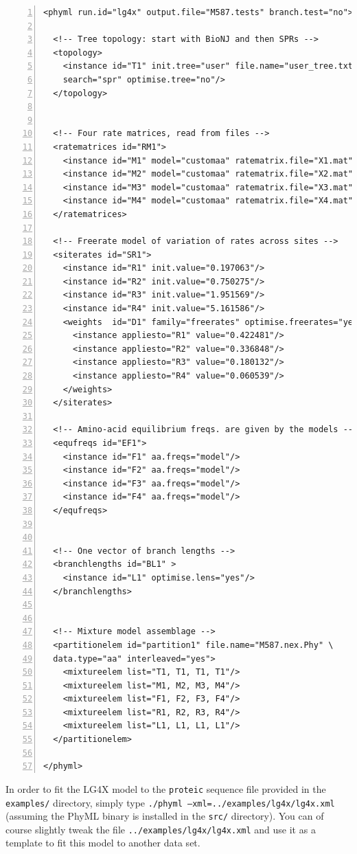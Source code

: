 \documentclass[a4paper,12pt]{article}
\newcommand{\x}[1]{\texttt{#1}}
\begin{document}
\vspace{0.2cm}
\begin{Verbatim}[frame=single, label=LG4X, samepage=true, baselinestretch=0.5,
  fontsize=\small, numbers=left]
<phyml run.id="lg4x" output.file="M587.tests" branch.test="no">

  <!-- Tree topology: start with BioNJ and then SPRs -->
  <topology>
    <instance id="T1" init.tree="user" file.name="user_tree.txt" \
    search="spr" optimise.tree="no"/>
  </topology>


  <!-- Four rate matrices, read from files -->
  <ratematrices id="RM1">
    <instance id="M1" model="customaa" ratematrix.file="X1.mat"/>
    <instance id="M2" model="customaa" ratematrix.file="X2.mat"/>
    <instance id="M3" model="customaa" ratematrix.file="X3.mat"/>
    <instance id="M4" model="customaa" ratematrix.file="X4.mat"/>
  </ratematrices>

  <!-- Freerate model of variation of rates across sites -->
  <siterates id="SR1">
    <instance id="R1" init.value="0.197063"/>
    <instance id="R2" init.value="0.750275"/>
    <instance id="R3" init.value="1.951569"/>
    <instance id="R4" init.value="5.161586"/>
    <weights  id="D1" family="freerates" optimise.freerates="yes">
      <instance appliesto="R1" value="0.422481"/>
      <instance appliesto="R2" value="0.336848"/>
      <instance appliesto="R3" value="0.180132"/>
      <instance appliesto="R4" value="0.060539"/>
    </weights>
  </siterates>

  <!-- Amino-acid equilibrium freqs. are given by the models -->
  <equfreqs id="EF1">
    <instance id="F1" aa.freqs="model"/>
    <instance id="F2" aa.freqs="model"/>
    <instance id="F3" aa.freqs="model"/>
    <instance id="F4" aa.freqs="model"/>
  </equfreqs>


  <!-- One vector of branch lengths -->
  <branchlengths id="BL1" >
    <instance id="L1" optimise.lens="yes"/>
  </branchlengths>


  <!-- Mixture model assemblage -->
  <partitionelem id="partition1" file.name="M587.nex.Phy" \
  data.type="aa" interleaved="yes">
    <mixtureelem list="T1, T1, T1, T1"/>
    <mixtureelem list="M1, M2, M3, M4"/>
    <mixtureelem list="F1, F2, F3, F4"/>
    <mixtureelem list="R1, R2, R3, R4"/>
    <mixtureelem list="L1, L1, L1, L1"/>
  </partitionelem>

</phyml>
\end{Verbatim}

In order to fit the LG4X model to the \x{proteic} sequence file provided in the \x{examples/}
directory, simply type \x{./phyml --xml=../examples/lg4x/lg4x.xml} (assuming the PhyML binary is installed
in the \x{src/} directory). You can of course slightly tweak the file \x{../examples/lg4x/lg4x.xml}
and use it as a template to fit this model to another data set.
\end{document}
